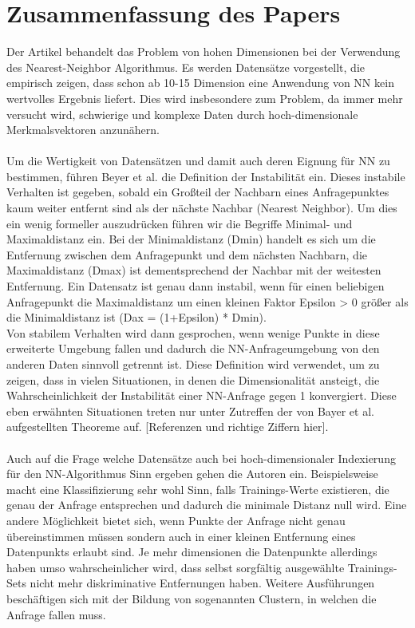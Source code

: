 \documentclass{article}
\begin{document}
\section{Zusammenfassung des Papers}
Der Artikel behandelt das Problem von hohen Dimensionen bei der Verwendung des Nearest-Neighbor Algorithmus. Es werden Datensätze vorgestellt, die empirisch zeigen, dass schon ab 10-15 Dimension eine Anwendung von NN kein wertvolles Ergebnis liefert. Dies wird insbesondere zum Problem, da immer mehr versucht wird, schwierige und komplexe Daten durch hoch-dimensionale Merkmalsvektoren anzunähern.  
\\
\\
Um die Wertigkeit von Datensätzen und damit auch deren Eignung für NN zu bestimmen, führen Beyer et al. die Definition der Instabilität ein. Dieses instabile Verhalten ist gegeben, sobald ein Großteil der Nachbarn eines Anfragepunktes kaum weiter entfernt sind als der nächste Nachbar (Nearest Neighbor). Um dies ein wenig formeller auszudrücken führen wir die Begriffe Minimal- und Maximaldistanz ein. Bei der Minimaldistanz (Dmin) handelt es sich um die Entfernung zwischen dem Anfragepunkt und dem nächsten Nachbarn, die Maximaldistanz (Dmax) ist dementsprechend der Nachbar mit der weitesten Entfernung. Ein Datensatz ist genau dann instabil, wenn für einen beliebigen Anfragepunkt die Maximaldistanz um einen kleinen Faktor Epsilon > 0 größer als die Minimaldistanz ist (Dax = (1+Epsilon) * Dmin).
\\
Von stabilem Verhalten wird dann gesprochen, wenn wenige Punkte in diese erweiterte Umgebung fallen und dadurch die NN-Anfrageumgebung von den anderen Daten sinnvoll getrennt ist. Diese Definition wird verwendet, um zu zeigen, dass in vielen Situationen, in denen die Dimensionalität ansteigt, die Wahrscheinlichkeit der Instabilität einer NN-Anfrage gegen 1 konvergiert. Diese eben erwähnten Situationen treten nur unter Zutreffen der von Bayer et al. aufgestellten Theoreme auf. [Referenzen und richtige Ziffern hier].
\\
\\
Auch auf die Frage welche Datensätze auch bei hoch-dimensionaler Indexierung für den NN-Algorithmus Sinn ergeben gehen die Autoren ein. Beispielsweise macht eine Klassifizierung sehr wohl Sinn, falls Trainings-Werte existieren, die genau der Anfrage entsprechen und dadurch die minimale Distanz null wird. Eine andere Möglichkeit bietet sich, wenn Punkte der Anfrage nicht genau übereinstimmen müssen sondern auch in einer kleinen Entfernung eines Datenpunkts erlaubt sind. Je mehr dimensionen die Datenpunkte allerdings haben umso wahrscheinlicher wird, dass selbst sorgfältig ausgewählte Trainings-Sets nicht mehr diskriminative Entfernungen haben. Weitere Ausführungen beschäftigen sich mit der Bildung von sogenannten Clustern, in welchen die Anfrage fallen muss.
\end{document}
